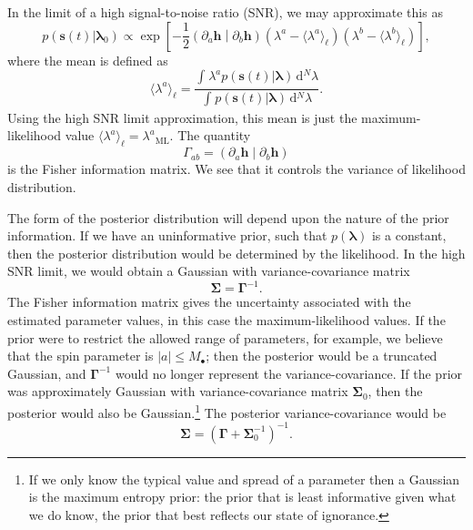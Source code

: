 \documentclass[a4paper, 11pt, titlepage, twoside]{report}
\newcommand{\sub}[1]{\ensuremath{_\mathrm{#1}}}
\newcommand{\recip}[1]{\ensuremath{\frac{1}{#1}}}
\newcommand{\innerprod}[2]{\ensuremath{\left({#1}\middle|{#2}\right)}}
\newcommand{\dd}{\ensuremath{\mathrm{d}}}
\newcommand{\intd}[4]{\ensuremath{\int_{#1}^{#2}{#3}\,\dd{#4}}}
\begin{document}
In the limit of a high signal-to-noise ratio (SNR), we may approximate this as\cite{Vallisneri2008}
\begin{equation}
p(\boldsymbol{s}(t)|\boldsymbol{\lambda}_0) \propto \exp\left[-\recip{2}\innerprod{\partial_a\boldsymbol{h}}{\partial_b\boldsymbol{h}}\left(\lambda^a - \langle\lambda^a\rangle_\ell\right)\left(\lambda^b - \langle\lambda^b\rangle_\ell\right)\right],
\end{equation}
where the mean is defined as
\begin{equation}
\langle\lambda^a\rangle_\ell = \frac{\intd{}{}{\lambda^a p(\boldsymbol{s}(t)|\boldsymbol{\lambda})}{^N \lambda}}{\intd{}{}{p(\boldsymbol{s}(t)|\boldsymbol{\lambda})}{^N \lambda}}.
\end{equation}
Using the high SNR limit approximation, this mean is just the maximum-likelihood value $\langle\lambda^a\rangle_\ell = \lambda^a\sub{ML}$. The quantity
\begin{equation}
\Gamma_{ab} = \innerprod{\partial_a\boldsymbol{h}}{\partial_b\boldsymbol{h}}
\end{equation}
is the Fisher information matrix. We see that it controls the variance of likelihood distribution.

The form of the posterior distribution will depend upon the nature of the prior information. If we have an uninformative prior, such that $p(\boldsymbol{\lambda})$ is a constant, then the posterior distribution would be determined by the likelihood. In the high SNR limit, we would obtain a Gaussian with variance-covariance matrix
\begin{equation}
\boldsymbol{\Sigma} = \boldsymbol{\Gamma}^{-1}.
\end{equation}
The Fisher information matrix gives the uncertainty associated with the estimated parameter values, in this case the maximum-likelihood values. If the prior were to restrict the allowed range of parameters, for example, we believe that the spin parameter is $|a| \leq M_\bullet$; then the posterior would be a truncated Gaussian, and $\boldsymbol{\Gamma}^{-1}$ would no longer represent the variance-covariance. If the prior was approximately Gaussian with variance-covariance matrix $\boldsymbol{\Sigma}_0$, then the posterior would also be Gaussian.\footnote{If we only know the typical value and spread of a parameter then a Gaussian is the maximum entropy prior\cite{Jaynes2003}: the prior that is least informative given what we do know, the prior that best reflects our state of ignorance.} The posterior variance-covariance would be\cite{Cutler1994, Vallisneri2008}
\begin{equation}
\boldsymbol{\Sigma} = \left(\boldsymbol{\Gamma} + \boldsymbol{\Sigma}_0^{-1}\right)^{-1}.
\end{equation}
\end{document}
